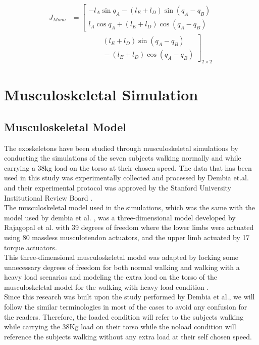 \documentclass[10pt,letterpaper]{article}
\begin{document}
\begin{equation}\label{Eqn_Mono_Jacobian}
\begin{aligned}
J_{Mono}&=
\left[\begin{matrix}
-l_{A}\sin{q_{A}}- (l_ {E} + l_ {D})\sin (q_ {A} - q_ {B})\\
l_{A}\cos{q_{A}} + (l_{E} + l_{D})\cos (q_{A} - q_ {B})
\end{matrix}\right.\\
&\qquad\qquad
\left.\begin{matrix}
{} (l_ {E} + l_ {D})\sin (q_ {A} - q_ {B})\\
{} - (l_ {E} + l_ {D})\cos (q_ {A} - q_ {B})
\end{matrix}\right]_{2\times 2}
\end{aligned}
\end{equation}
\section*{Musculoskeletal Simulation}
\subsection*{Musculoskeletal Model}
The exoskeletons have been studied through musculoskeletal simulations by conducting the simulations of the seven subjects walking normally and while carrying a 38kg load on the torso at their chosen speed. The data that has been used in this study was experimentally collected and processed by Dembia et.al. \cite{93} and their experimental protocol was approved by the Stanford University Institutional Review Board \cite{93}.\\
The musculoskeletal model used in the simulations, which was the same with the model used by dembia et al. \cite{93}, was a three-dimensional model developed by Rajagopal et al. \cite{130} with 39 degrees of freedom where the lower limbs were actuated using 80 massless musculotendon actuators, and the upper limb actuated by 17 torque actuators\cite{130}. \\
This three-dimensional musculoskeletal model was adapted by locking some unnecessary degrees of freedom for both normal walking and walking with a heavy load scenarios and modeling the extra load on the torso of the musculoskeletal model for the walking with heavy load condition \cite{93}.\\
Since this research was built upon the study performed by Dembia et al., we will follow the similar terminologies in most of the cases to avoid any confusion for the readers. Therefore, the loaded condition will refer to the subjects walking while carrying the 38Kg load on their torso while the noload condition will reference the subjects walking without any extra load at their self chosen speed.
\end{document}
